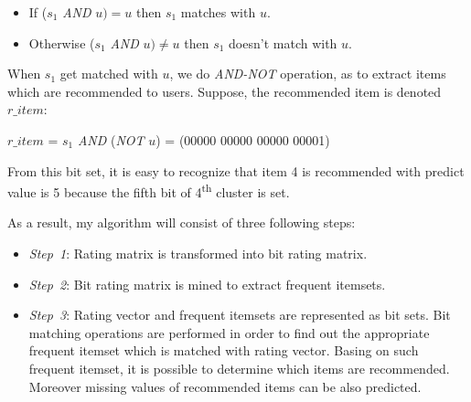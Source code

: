 \documentclass{sig-alternate}
\begin{document}
\begin{itemize}
\item If ($s_1$ \textit{AND} $u) = u$ then $s_1$ matches with $u$.
\item Otherwise ($s_1$ \textit{AND} $u) \neq u$ then $s_1$ doesn't match with $u$.
\end{itemize}
When $s_1$ get matched with $u$, we do \textit{AND-NOT} operation, as to extract items which are recommended to users. Suppose, the recommended item is denoted $r\_item$:
\begin{center}
$r\_item$ = $s_1$ \textit{AND} (\textit{NOT} $u$) = (00000 00000 00000 00001)
\end{center}
From this bit set, it is easy to recognize that item 4 is recommended with predict value is 5 because the fifth bit of 4\textsuperscript{th} cluster is set.

As a result, my algorithm will consist of three following steps:
\begin{itemize}
\item \textit{Step~1}: Rating matrix is transformed into bit rating matrix.
\item \textit{Step~2}: Bit rating matrix is mined to extract frequent itemsets.
\item \textit{Step~3}: Rating vector and frequent itemsets are represented as bit sets. Bit matching operations are performed in order to find out the appropriate frequent itemset which is matched with rating vector. Basing on such frequent itemset, it is possible to determine which items are recommended. Moreover missing values of recommended items can be also predicted.
\end{itemize}
\end{document}
